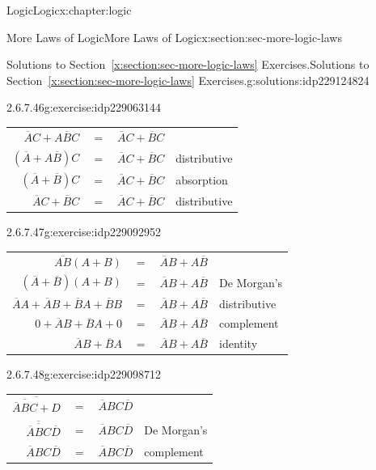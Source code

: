 \documentclass[twoside,10pt,]{book}
\newcommand{\tabularfont}{\relax}
\newcommand{\xreffont}{\relax}
\numberwithin{equation}{section}
\begin{document}
\begin{chapterptx}{Logic}{}{Logic}{}{}{x:chapter:logic}
\begin{sectionptx}{More Laws of Logic}{}{More Laws of Logic}{}{}{x:section:sec-more-logic-laws}
\begin{solutions-subsection}{Solutions to Section~{\xreffont\ref*{x:section:sec-more-logic-laws}} Exercises.}{}{Solutions to Section~{\xreffont\ref*{x:section:sec-more-logic-laws}} Exercises.}{}{}{g:solutions:idp229124824}
\begin{exercisegroup}
\begin{divisionsolutioneg}{2.6.7.46}{}{g:exercise:idp229063144}
\begin{center}
{\begin{tabular}{llll}
\multicolumn{1}{r}{\(\overline{A}{}C+A\overline{B}{}C\)}&\(=\)&\(\overline{A}{}C+\overline{B}{}C\)&\tabularnewline[0pt]
\multicolumn{1}{r}{\((\overline{A}{}+A\overline{B}{})C\)}&\(=\)&\(\overline{A}{}C+\overline{B}{}C\)&distributive\tabularnewline[0pt]
\multicolumn{1}{r}{\((\overline{A}{}+\overline{B}{})C\)}&\(=\)&\(\overline{A}{}C+\overline{B}{}C\)&absorption\tabularnewline[0pt]
\multicolumn{1}{r}{\(\overline{A}{}C+\overline{B}{}C\)}&\(=\)&\(\overline{A}{}C+\overline{B}{}C\)&distributive
\end{tabular}
}%
\end{center}%
\end{divisionsolutioneg}%
\begin{divisionsolutioneg}{2.6.7.47}{}{g:exercise:idp229092952}%
\par\smallskip%
\noindent\hypertarget{g:solution:idp229093464-main}{}\begin{center}%
{\tabularfont%
\begin{tabular}{llll}
\multicolumn{1}{r}{\(\overline{AB}(A+B)\)}&\(=\)&\(\overline{A}{}B+A\overline{B}{}\)&\tabularnewline[0pt]
\multicolumn{1}{r}{\((\overline{A}{}+\overline{B}{})(A+B)\)}&\(=\)&\(\overline{A}{}B+A\overline{B}{}\)&De Morgan's\tabularnewline[0pt]
\multicolumn{1}{r}{\(\overline{A}{}A+\overline{A}{}B+\overline{B}{}A+\overline{B}{}B\)}&\(=\)&\(\overline{A}{}B+A\overline{B}{}\)&distributive\tabularnewline[0pt]
\multicolumn{1}{r}{\(0+\overline{A}{}B+\overline{B}{}A+0\)}&\(=\)&\(\overline{A}{}B+A\overline{B}{}\)&complement\tabularnewline[0pt]
\multicolumn{1}{r}{\(\overline{A}{}B+\overline{B}{}A\)}&\(=\)&\(\overline{A}{}B+A\overline{B}{}\)&identity
\end{tabular}
}%
\end{center}%
\end{divisionsolutioneg}%
\begin{divisionsolutioneg}{2.6.7.48}{}{g:exercise:idp229098712}%
\par\smallskip%
\noindent\hypertarget{g:solution:idp229102680-main}{}\begin{center}%
{\tabularfont%
\begin{tabular}{llll}
\multicolumn{1}{r}{\(\overline{\overline{\overline{A}{}BC}+D}\)}&\(=\)&\(\overline{A}{}BC\overline{D}\)&\tabularnewline[0pt]
\multicolumn{1}{r}{\(\overline{\overline{\overline{A}{}BC}}\overline{D}\)}&\(=\)&\(\overline{A}{}BC\overline{D}\)&De Morgan's\tabularnewline[0pt]
\multicolumn{1}{r}{\(\overline{A}{}BC\overline{D}\)}&\(=\)&\(\overline{A}{}BC\overline{D}\)&complement
\end{tabular}
}
\end{center}
\end{divisionsolutioneg}
\end{exercisegroup}
\end{solutions-subsection}
\end{sectionptx}
\end{chapterptx}
\end{document}
